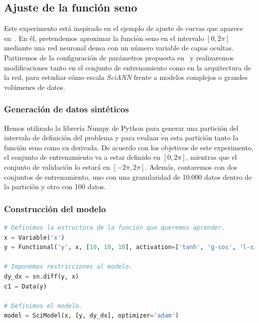 \subsection{Ajuste de la función seno}
Este experimento está inspirado en el ejemplo de ajuste de curvas que aparece en~\cite{Haghighat2021}. En él, pretendemos aproximar la función seno en el intervalo $[0,2\pi]$ mediante una red neuronal densa con un número variable de capas ocultas. Partiremos de la configuración de parámetros propuesta en~\cite{Haghighat2021} y realizaremos modificaciones tanto en el conjunto de entrenamiento como en la arquitectura de la red, para estudiar cómo escala \textit{SciANN} frente a modelos complejos o grandes volúmenes de datos. 

\subsubsection{Generación de datos sintéticos}
Hemos utilizado la librería Numpy de Python para generar una partición del intervalo de definición del problema y para evaluar en esta partición tanto la función seno como su derivada. De acuerdo con los objetivos de este experimento, el conjunto de entrenamiento va a estar definido en $[0,2\pi]$, mientras que el conjunto de validación lo estará en $[-2\pi,2\pi]$. Además, contaremos con dos conjuntos de entrenamiento, uno con una granularidad de 10.000 datos dentro de la partición y otro con 100 datos. 

\subsubsection{Construcción del modelo}

\begin{lstlisting}[language=Python,caption={Modelo en \textit{SciANN} para el ajuste de la función seno.},label={lst:exp1-sin}]
# Definimos la estructura de la función que queremos aprender.
x = Variable('x')
y = Functional('y', x, [10, 10, 10], activation=['tanh', 'g-cos', 'l-sin'])

# Imponemos restricciones al modelo. 
dy_dx = sn.diff(y, x)
c1 = Data(y)

# Definimos el modelo.
model = SciModel(x, [y, dy_dx], optimizer='adam')
\end{lstlisting}

